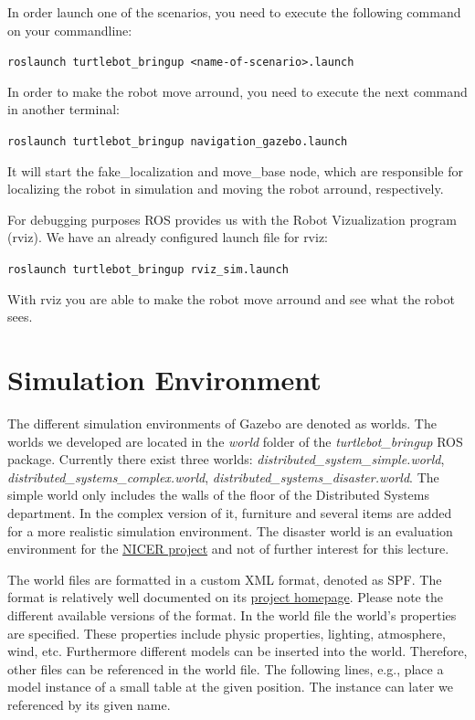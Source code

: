 In order launch one of the scenarios, you need to execute the following command on your commandline:

\verb$roslaunch turtlebot_bringup <name-of-scenario>.launch$

In order to make the robot move arround, you need to execute the next command in another terminal:

\verb$roslaunch turtlebot_bringup navigation_gazebo.launch$

It will start the fake\_localization and move\_base node, which are responsible for localizing the robot in simulation and moving the robot arround, respectively.

For debugging purposes ROS provides us with the Robot Vizualization program (rviz). We have an already configured launch file for rviz:

\verb$roslaunch turtlebot_bringup rviz_sim.launch$

With rviz you are able to make the robot move arround and see what the robot sees.

\section{Simulation Environment}
\label{sec:SimulationEnvironment}

The different simulation environments of Gazebo are denoted as worlds. The worlds we developed are located in the \emph{world} folder of the \emph{turtlebot\_bringup} ROS package. Currently there exist three worlds: \emph{distributed\_system\_simple.world}, \emph{distributed\_sys\-tems\_com\-plex.world}, \emph{distributed\_systems\_disaster.world}. The simple world only includes the walls of the floor of the Distributed Systems department. In the complex version of it, furniture and several items are added for a more realistic simulation environment. The disaster world is an evaluation environment for the \href{http://www.uni-kassel.de/eecs/fachgebiete/vs/research/nicer.html}{NICER project} and not of further interest for this lecture. 

The world files are formatted in a custom XML format, denoted as SPF. The format is relatively well documented on its \href{http://sdformat.org}{project homepage}. Please note the different available versions of the format. In the world file the world's properties are specified. These properties include physic properties, lighting, atmosphere, wind, etc. Furthermore different models can be inserted into the world. Therefore, other files can be referenced in the world file. The following lines, e.g., place a model instance of a small table at the given position. The instance can later we referenced by its given name.

